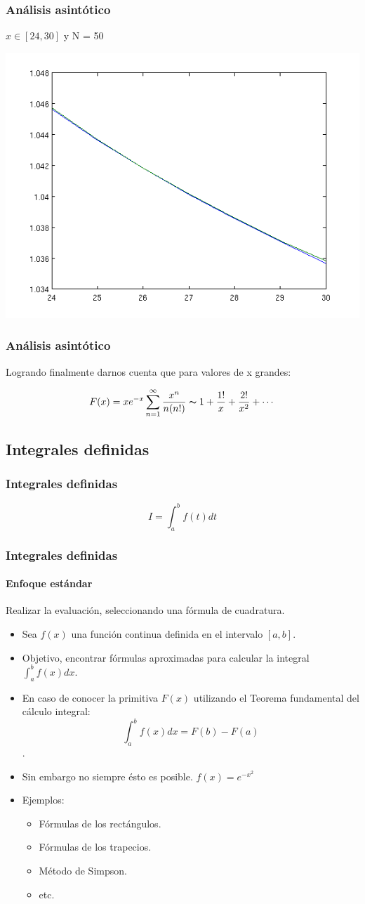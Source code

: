 \documentclass{beamer}
\begin{document}
\frame
{
\frametitle{Análisis asintótico}
$x \in [24,30]$ y N = 50

\begin{center}
\includegraphics[scale=0.5]{../informe/images/2d.png}
\end{center}
}

\frame
{
\frametitle{Análisis asintótico}
Logrando finalmente darnos cuenta que para valores de x grandes:

$$
F(x) = x e^{-x} \sum_{n=1}^{\infty}\frac{x^n}{n(n!)} \thicksim 1 + \frac{1!}{x} + \frac{2!}{x^2} + \cdots
$$
}


\subsection{Integrales definidas}
\frame
{
\frametitle{Integrales definidas}

$$ I = \int_{a}^{b} f(t) dt $$
}

\frame
{
\frametitle{Integrales definidas}
\framesubtitle{Enfoque estándar}
Realizar la evaluación, seleccionando una fórmula de cuadratura.

\begin{itemize}
	\item Sea $f(x)$ una función continua definida en el intervalo $[a, b]$.
	\item Objetivo, encontrar fórmulas aproximadas para calcular la integral $\int_{a}^{b}f(x) dx$.
	\item En caso de conocer la primitiva $F(x)$ utilizando el Teorema fundamental del cálculo integral:
	 $$\int_{a}^{b}f(x) dx = F(b) - F(a)$$.
	\item Sin embargo no siempre ésto es posible. $f(x) = e^{-x^{2}}$
	\item Ejemplos:
	\begin{itemize}
	        \item Fórmulas de los rectángulos.
	        \item Fórmulas de  los trapecios.
	        \item Método de Simpson.
	        \item etc.
	\end{itemize}
\end{itemize}
}
\end{document}
